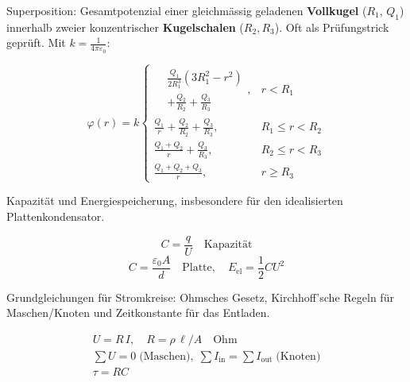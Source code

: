 \begin{runintext}
Superposition: Gesamtpotenzial einer gleichmässig geladenen \textbf{Vollkugel} ($R_1$, $Q_1$) innerhalb zweier konzentrischer \textbf{Kugelschalen} ($R_2, R_3$). Oft als Prüfungstrick geprüft. Mit $k = \frac{1}{4\pi\varepsilon_0}$:
\end{runintext}
\begin{formulabox}
\[
\varphi(r) = k \begin{cases}
 \begin{aligned}&\tfrac{Q_1}{2R_1^3}(3R_1^2 - r^2)\\ &+ \tfrac{Q_2}{R_2} + \tfrac{Q_3}{R_3}\end{aligned}, & r < R_1 \\[2ex]
 \frac{Q_1}{r} + \frac{Q_2}{R_2} + \frac{Q_3}{R_3}, & R_1 \le r < R_2 \\[1ex]
 \frac{Q_1 + Q_2}{r} + \frac{Q_3}{R_3}, & R_2 \le r < R_3 \\[1ex]
 \frac{Q_1 + Q_2 + Q_3}{r}, & r \ge R_3
\end{cases}
\]
\end{formulabox}

\begin{runintext}
Kapazität und Energiespeicherung, insbesondere für den idealisierten Plattenkondensator.
\end{runintext}
\begin{formulabox}
\[ C = \frac{q}{U} \quad \text{Kapazität} \]
\formulasep
\[ C = \frac{\varepsilon_0 A}{d} \quad \text{Platte}, \quad E_{\mathrm{el}} = \frac{1}{2}CU^2 \]
\end{formulabox}

\begin{runintext}
Grundgleichungen für Stromkreise: Ohmsches Gesetz, Kirchhoff'sche Regeln für Maschen/Knoten und Zeitkonstante für das Entladen.
\end{runintext}
\begin{formulabox}
\[
\begin{gathered}
U = R\,I, \quad R = \rho\,\ell/A \quad \text{Ohm} \\
\sum U = 0 \;\text{(Maschen)},\; \sum I_{\mathrm{in}} = \sum I_{\mathrm{out}} \;\text{(Knoten)} \\
\tau = RC
\end{gathered}
\]
\end{formulabox}

